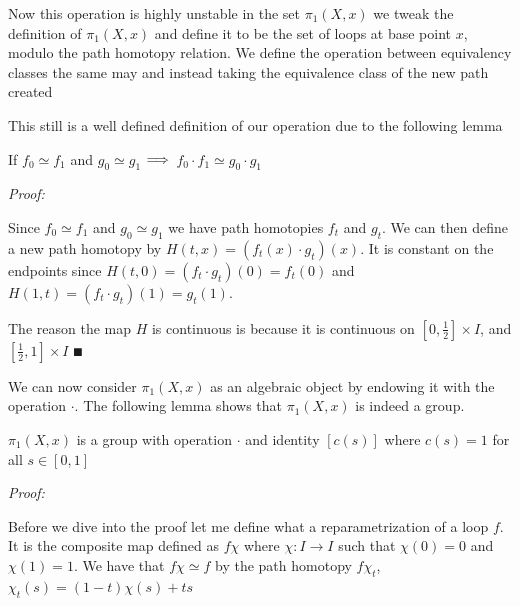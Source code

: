\documentclass[paper=a4,fontsize=paper,12.5pt]{book}
\newcommand{\3}{\vspace*{3mm}}
\newcommand{\Proof}{\textit{Proof:}}
\newcommand{\RIGHT}{\Longrightarrow \hspace*{.5mm}}
\newcommand{\Fund}[2]{{\pi}_{1}(#1,#2)}
\begin{document}
\3

Now this operation is highly unstable in the set ${\pi}_{1}(X,{x})$ we tweak the definition of ${\pi}_{1}(X,{x})$ and define it to be the set of loops at base point $x$, modulo the path homotopy relation. We define the operation between equivalency classes the same may and instead taking the equivalence class of the new path created

\3

This still is a well defined definition of our operation due to the following lemma

\3

\begin{lemma}

If ${f}_{0} \simeq {f}_{1}$ and ${g}_{0} \simeq {g}_{1}$ $\RIGHT$ ${f}_{0} \cdot {f}_{1} \simeq {g}_{0} \cdot {g}_{1}$


\end{lemma}

\Proof

Since ${f}_{0} \simeq {f}_{1}$ and ${g}_{0} \simeq {g}_{1}$ we have path homotopies ${f}_{t}$ and ${g}_{t}$. We can then define a new path homotopy by $H(t,x) = ({f}_{t}(x) \cdot {g}_{t})(x)$. It is constant on the endpoints since $H(t,0) = ({f}_{t} \cdot {g}_{t})(0) = {f}_{t}(0)$ and $H(1,t) = ({f}_{t} \cdot {g}_{t})(1) = {g}_{t}(1)$. 

\3

The reason the map $H$ is continuous is because it is continuous on $[0,\frac{1}{2}] \times I$, and $[\frac{1}{2},1] \times I$ $\QED$

\3

We can now consider $\Fund{X}{x}$ as an algebraic object by endowing it with the operation $\cdot$. The following lemma shows that $\Fund{X}{x}$ is indeed a group.

\3

\begin{lemma}

 $\Fund{X}{x}$ is a group with operation $\cdot$ and identity $[c(s)]$ where $c(s) = 1$ for all $s \in [0,1]$


\end{lemma}

\Proof

Before we dive into the proof let me define what a reparametrization of a loop $f$. It is the composite map defined as $f\chi$ where $\chi: I \to I$ such that $\chi(0) = 0$ and $\chi(1) =1$. We have that $f\chi \simeq f$ by the path homotopy $f{\chi}_{t}$, ${\chi}_{t}(s) = (1-t)\chi(s) + ts$
\end{document}
